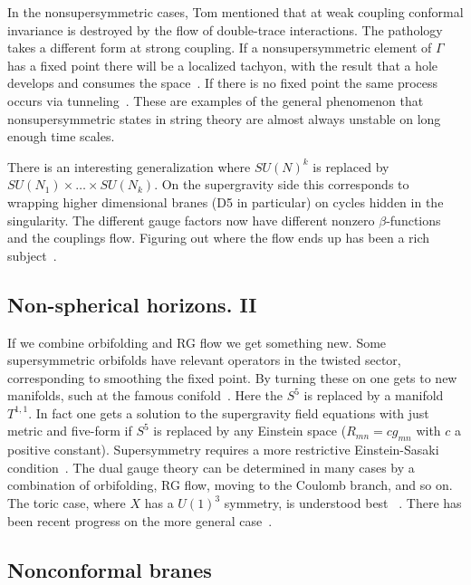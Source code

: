 \documentclass[12pt]{article}
\begin{document}
{In the nonsupersymmetric cases, Tom mentioned that at weak coupling conformal invariance is destroyed by the flow of double-trace interactions.  The pathology takes a different form at strong coupling.  If a nonsupersymmetric element of $\Gamma$ has a fixed point there will be a localized tachyon, with the result that a hole develops and consumes the space~\cite{Adams:2001sv}.  If there is no fixed point the same process occurs via tunneling~\cite{Horowitz:2007pr}.  These are examples of the general phenomenon that nonsupersymmetric states in string theory are almost always unstable on long enough time scales.

There is an interesting generalization where $SU(N)^k$ is replaced by $SU(N_1) \times \ldots \times SU(N_k)$.  On the supergravity side this corresponds to wrapping higher dimensional branes (D5 in particular) on cycles hidden in the singularity.  The different gauge factors now have different nonzero $\beta$-functions and the couplings flow.  Figuring out where the flow ends up has been a rich subject~\cite{Klebanov:2000hb}.

\subsection{Non-spherical horizons. II}

If we combine orbifolding and RG flow we get something new.  Some supersymmetric orbifolds have relevant operators in the twisted sector, corresponding to smoothing the fixed point.  By turning these on one gets to new manifolds, such at the famous conifold~\cite{Klebanov:1998hh}.  Here the $S^5$ is replaced by a manifold $T^{1,1}$.  In fact one gets a solution to the supergravity field equations with just metric and five-form if $S^5$ is replaced by any Einstein space ($R_{mn} = c g_{mn}$ with $c$ a positive constant).  Supersymmetry requires a more restrictive Einstein-Sasaki condition~\cite{Kehagias:1998gn}.  The dual gauge theory can be determined in many cases by a combination of orbifolding, RG flow, moving to the Coulomb branch, and so on.  The toric case, where $X$ has a $U(1)^3$ symmetry, is understood best ~\cite{Franco:2005sm}.  There has been recent progress on the more general case~\cite{Aspinwall:2010mw}.

\subsection{Nonconformal branes~\cite{Itzhaki:1998dd}}

}
\end{document}

